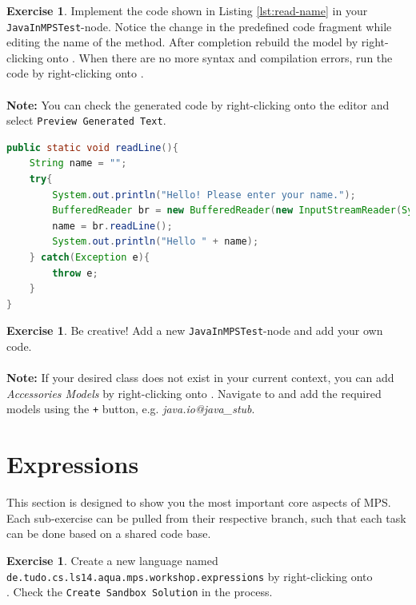 \documentclass[a4paper,oneside,DIV8,10pt]{scrartcl}
\theoremstyle{definition}
\newtheorem{aufgabe}[satz]{Exercise}
\begin{document}
  \begin{aufgabe}
  	Implement the code shown in Listing \ref{lst:read-name} in your \texttt{JavaInMPSTest}-node. Notice the change in the predefined code fragment while editing the name of the method. After completion rebuild the model by right-clicking onto . When there are no more syntax and compilation errors, run the code by right-clicking onto .\\
  	\\
  	\textbf{Note:} You can check the generated code by right-clicking onto the editor and select \texttt{Preview Generated Text}.
  	
  	\begin{lstlisting}[language=Java,caption={Java code to read a line from the console and print the result}, captionpos=b, label={lst:read-name}]
public static void readLine(){
	String name = "";
	try{
		System.out.println("Hello! Please enter your name.");
		BufferedReader br = new BufferedReader(new InputStreamReader(System.in));
		name = br.readLine();
		System.out.println("Hello " + name);
	} catch(Exception e){
		throw e;
	}
}
  		\end{lstlisting}
  \label{alg:read-name}
  \end{aufgabe}

  \begin{aufgabe}
  	Be creative! Add a new \texttt{JavaInMPSTest}-node and add your own code.\\
  	\\
  	\textbf{Note:} If your desired class does not exist in your current context, you can add \textit{Accessories Models} by right-clicking onto . Navigate to  and add the required models using the \texttt{+} button, e.g. \textit{java.io@java\_stub}.
  \end{aufgabe}

	\section{Expressions}
	
	This section is designed to show you the most important core aspects of MPS. Each sub-exercise can be pulled from their respective branch, such that each task can be done based on a shared code base.
	
	\begin{aufgabe}
		Create a new language named \\
		\texttt{de.tudo.cs.ls14.aqua.mps.workshop.expressions} by right-clicking onto\\ . Check the \texttt{Create Sandbox Solution} in the process.
	\end{aufgabe}
\end{document}
